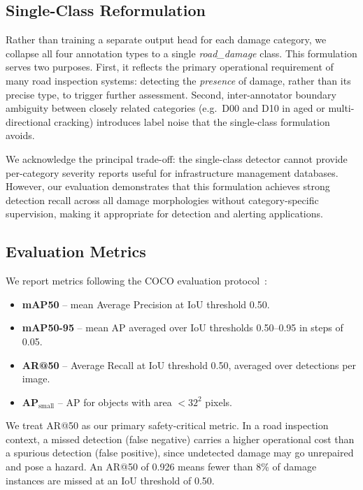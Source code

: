 \documentclass[conference]{IEEEtran}
\begin{document}
\subsection{Single-Class Reformulation}

Rather than training a separate output head for each damage category, we collapse all
four annotation types to a single \textit{road\_damage} class.
This formulation serves two purposes.
First, it reflects the primary operational requirement of many road inspection
systems: detecting the \emph{presence} of damage, rather than its precise type, to
trigger further assessment.
Second, inter-annotator boundary ambiguity between closely related categories (e.g.\
D00 and D10 in aged or multi-directional cracking) introduces label noise that the
single-class formulation avoids.

We acknowledge the principal trade-off: the single-class detector cannot provide
per-category severity reports useful for infrastructure management databases.
However, our evaluation demonstrates that this formulation achieves strong detection
recall across all damage morphologies without category-specific supervision, making it
appropriate for detection and alerting applications.

\subsection{Evaluation Metrics}

We report metrics following the COCO evaluation protocol~\cite{lin2014coco}:
\begin{itemize}
  \item \textbf{mAP50} -- mean Average Precision at IoU threshold 0.50.
  \item \textbf{mAP50-95} -- mean AP averaged over IoU thresholds 0.50--0.95 in
        steps of 0.05.
  \item \textbf{AR@50} -- Average Recall at IoU threshold 0.50, averaged over
        detections per image.
  \item \textbf{AP$_\text{small}$} -- AP for objects with area $<32^2$ pixels.
\end{itemize}

We treat AR@50 as our primary safety-critical metric.
In a road inspection context, a missed detection (false negative) carries a higher
operational cost than a spurious detection (false positive), since undetected damage
may go unrepaired and pose a hazard.
An AR@50 of 0.926 means fewer than 8\% of damage instances are missed at an IoU
threshold of 0.50.
\end{document}
